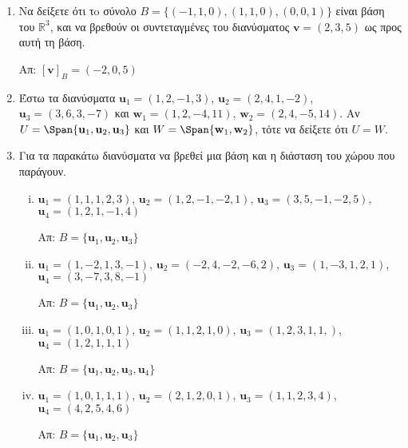 \begin{enumerate}
  \item Να δείξετε ότι τo σύνολο $ B = \{ (-1,1,0), (1,1,0), 
    (0,0,1) \} $ είναι βάση του 
    $ \mathbb{R}^{3} $, και να βρεθούν οι συντεταγμένες του διανύσματος 
    $ \mathbf{v} = (2,3,5) $ ως προς αυτή τη βάση.

    \hfill Απ: $ [\mathbf{v}]_{B} = (-2,0,5) $ 

  \item\label{ask:isoi} Έστω τα διανύσματα $ \mathbf{u}_{1} = (1,2,-1,3)$, 
    $\mathbf{u}_{2} = (2,4,1,-2)$, $ \mathbf{u} _{3} = (3,6,3,-7) $ και 
    $ \mathbf{w}_{1} = (1,2,-4,11)$, $ \mathbf{w}_{2} = (2,4,-5,14) $. 
    Αν $ U = \Span \{ \mathbf{u}_{1}, \mathbf{u}_{2}, \mathbf{u}_{3} \} $ και 
    $ W = \Span \{ \mathbf{w}_{1}, \mathbf{w}_{2} \} $, τότε να δείξετε ότι $ U=W $.

  \item\label{ask:parag2} Για τα παρακάτω διανύσματα να βρεθεί μια βάση και η διάσταση 
    του χώρου που παράγουν.
    \begin{enumerate}[(i)]
      \item $ \mathbf{u}_{1} = (1,1,1,2,3) $, $ \mathbf{u}_{2} = (1,2,-1,-2,1) $, 
        $ \mathbf{u} _{3} = (3,5,-1,-2,5) $, $ \mathbf{u}_{4} = (1,2,1,-1,4) $

        \hfill Απ: $ B = \{ \mathbf{u}_{1}, \mathbf{u}_{2}, \mathbf{u}_{3}\} $ 

      \item $ \mathbf{u}_{1} = (1,-2,1,3,-1) $, $ \mathbf{u}_{2} = (-2,4,-2,-6,2) $, $
        \mathbf{u}_{3} = (1,-3,1,2,1) $, $ \mathbf{u}_{4} = (3,-7,3,8,-1) $

        \hfill Απ: $ B = \{ \mathbf{u}_{1}, \mathbf{u}_{2}, \mathbf{u}_{3} \} $ 

      \item $ \mathbf{u}_{1} = (1,0,1,0,1) $, $ \mathbf{u}_{2} = (1,1,2,1,0) $, 
        $ \mathbf{u} _{3} = (1,2,3,1,1,) $, $ \mathbf{u}_{4} = (1,2,1,1,1) $

        \hfill Απ: $ B = \{ \mathbf{u}_{1}, \mathbf{u}_{2}, \mathbf{u}_{3}, 
        \mathbf{u}_{4} \} $ 
      \item $ \mathbf{u}_{1} = (1,0,1,1,1) $, $ \mathbf{u}_{2} = (2,1,2,0,1) $, 
        $ \mathbf{u} _{3} = (1,1,2,3,4) $, $ \mathbf{u}_{4} = (4,2,5,4,6) $

        \hfill Απ: $ B = \{ \mathbf{u}_{1}, \mathbf{u}_{2}, \mathbf{u}_{3} \} $ 
    \end{enumerate}


\end{enumerate}
